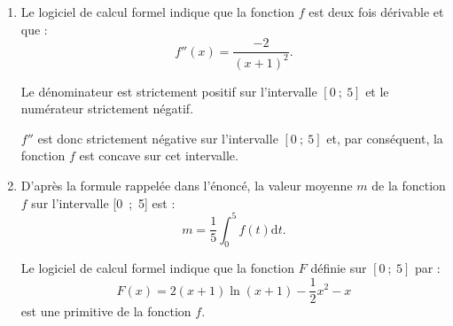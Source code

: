 \begin{corrige}
\begin{enumerate}
\begin{center}
\begin{extern}
               \end{extern}
          \end{center}
          \item %
          Le logiciel de calcul formel indique que la fonction $f$ est deux fois dérivable et que :
          \[ f''(x)=\dfrac{-2}{(x+1)^2}. \]
          \par
          Le dénominateur est strictement positif sur l'intervalle $[0~;~5]$ et le numérateur strictement négatif.
          \par
          $f''$ est donc strictement négative sur l'intervalle $[0~;~5]$ et, par conséquent, la fonction $f$ est concave sur cet intervalle.
          \item %
          D'après la formule rappelée dans l'énoncé, la valeur moyenne $m$ de la fonction $f$ sur l'intervalle [0~;~5] est :
          \[ m=\dfrac{1}{5}\displaystyle\int_{0}^{5}f(t)\text{d}t. \]
          \par
          Le logiciel de calcul formel indique que la fonction $F$ définie sur $[0~;~5]$ par :
          \[ F(x)=2(x+1)\ln(x+1)-\dfrac{1}{2}x^2-x \]
          est une primitive de la fonction $f$.
          \par

\end{enumerate}
\end{corrige}
